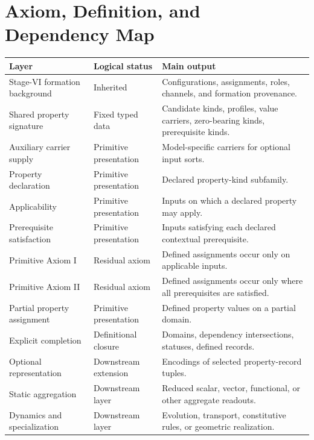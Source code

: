 \documentclass[11pt]{article}
\theoremstyle{definition}
\theoremstyle{remark}
\begin{document}
\section{Axiom, Definition, and Dependency Map}
\label{app:dependency-map}

\begin{tabularx}{\textwidth}{@{}>{\raggedright\arraybackslash}p{}>{\raggedright\arraybackslash}p{}X@{}}
\toprule
Layer & Logical status & Main output\\
\midrule
Stage-VI formation background & Inherited & Configurations, assignments, roles, channels, and formation provenance.\\
Shared property signature & Fixed typed data & Candidate kinds, profiles, value carriers, zero-bearing kinds, prerequisite kinds.\\
Auxiliary carrier supply & Primitive presentation & Model-specific carriers for optional input sorts.\\
Property declaration & Primitive presentation & Declared property-kind subfamily.\\
Applicability & Primitive presentation & Inputs on which a declared property may apply.\\
Prerequisite satisfaction & Primitive presentation & Inputs satisfying each declared contextual prerequisite.\\
Primitive Axiom I & Residual axiom & Defined assignments occur only on applicable inputs.\\
Primitive Axiom II & Residual axiom & Defined assignments occur only where all prerequisites are satisfied.\\
Partial property assignment & Primitive presentation & Defined property values on a partial domain.\\
Explicit completion & Definitional closure & Domains, dependency intersections, statuses, defined records.\\
Optional representation & Downstream extension & Encodings of selected property-record tuples.\\
Static aggregation & Downstream layer & Reduced scalar, vector, functional, or other aggregate readouts.\\
Dynamics and specialization & Downstream layer & Evolution, transport, constitutive rules, or geometric realization.\\
\bottomrule
\end{tabularx}
\end{document}
